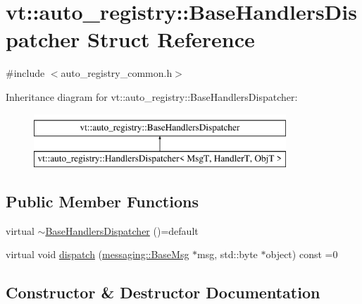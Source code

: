 \hypertarget{structvt_1_1auto__registry_1_1_base_handlers_dispatcher}{}\section{vt\+:\+:auto\+\_\+registry\+:\+:Base\+Handlers\+Dispatcher Struct Reference}
\label{structvt_1_1auto__registry_1_1_base_handlers_dispatcher}


{\ttfamily \#include $<$auto\+\_\+registry\+\_\+common.\+h$>$}

Inheritance diagram for vt\+:\+:auto\+\_\+registry\+:\+:Base\+Handlers\+Dispatcher\+:\begin{figure}[H]
\begin{center}
\leavevmode
\includegraphics[height=2.000000cm]{structvt_1_1auto__registry_1_1_base_handlers_dispatcher}
\end{center}
\end{figure}
\subsection*{Public Member Functions}
\begin{DoxyCompactItemize}
\item 
virtual \hyperlink{structvt_1_1auto__registry_1_1_base_handlers_dispatcher_ae9db8406a630a3ac4094986aa39c747e}{$\sim$\+Base\+Handlers\+Dispatcher} ()=default
\item 
virtual void \hyperlink{structvt_1_1auto__registry_1_1_base_handlers_dispatcher_af31a57d118de940836c3b8ea28b4a0d3}{dispatch} (\hyperlink{structvt_1_1messaging_1_1_base_msg}{messaging\+::\+Base\+Msg} $\ast$msg, std\+::byte $\ast$object) const =0
\end{DoxyCompactItemize}


\subsection{Constructor \& Destructor Documentation}
\mbox{\label{structvt_1_1auto__registry_1_1_base_handlers_dispatcher_ae9db8406a630a3ac4094986aa39c747e}} 
